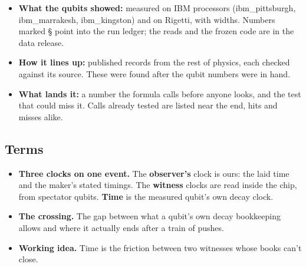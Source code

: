 \documentclass[11pt]{article}
\begin{document}
\begin{itemize}
\item \textbf{What the qubits showed:} measured on IBM processors (ibm\_pittsburgh, ibm\_marrakesh, ibm\_kingston) and on Rigetti, with widths. Numbers marked \S{} point into the run ledger; the reads and the frozen code are in the data release.
\item \textbf{How it lines up:} published records from the rest of physics, each checked against its source. These were found after the qubit numbers were in hand.
\item \textbf{What lands it:} a number the formula calls before anyone looks, and the test that could miss it. Calls already tested are listed near the end, hits and misses alike.
\end{itemize}
\subsection*{Terms}
\begin{itemize}
\item \textbf{Three clocks on one event.} The \textbf{observer's} clock is ours: the laid time and the maker's stated timings. The \textbf{witness} clocks are read inside the chip, from spectator qubits. \textbf{Time} is the measured qubit's own decay clock.
\item \textbf{The crossing.} The gap between what a qubit's own decay bookkeeping allows and where it actually ends after a train of pushes.
\item \textbf{Working idea.} Time is the friction between two witnesses whose books can't close.
\end{itemize}
\end{document}
